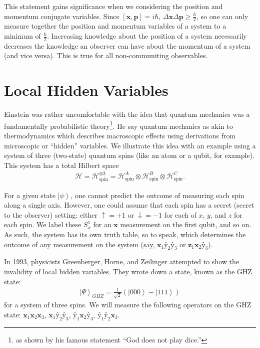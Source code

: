 \documentclass[11pt]{article} %
\newcommand{\ket}[1]{\left|#1\right\rangle}
\begin{document}
This statement gains significance when we considering the position and momentum conjugate variables. Since $\left[\textbf{\^x},\textbf{\^p}\right] = i\hbar$, $\Delta\textbf{\^x}\Delta\textbf{\^p} \geq \frac{\hbar}{2}$, so one can only measure together the position and momentum variables of a system to a minimum of $\frac{\hbar}{2}$. Increasing knowledge about the position of a system necessarily decreases the knowledge an observer can have about the momentum of a system (and vice versa). This is true for all non-communiting observables.

\section{Local Hidden Variables}

Einstein was rather uncomfortable with the idea that quantum mechanics was a fundamentally probabilistic theory\footnote{as shown by his famous statement ``God does not play dice.''}. He say quantum mechanics as akin to thermodynamics which describes macroscopic effects using derivations from microscopic or ``hidden'' variables. We illustrate this idea with an example using a system of three (two-state) quantum spins (like an atom or a qubit, for example). This system has a total Hilbert space
\begin{align}
\mathcal{H} = \mathcal{H}^{\otimes3}_\textrm{spin} = \mathcal{H}^A_\textrm{spin}\otimes\mathcal{H}^B_\textrm{spin}\otimes\mathcal{H}^C_\textrm{spin}.
\end{align}

For a given state $\ket{\psi}$, one cannot predict the outcome of measuring each spin along a single axis. However, one could assume that each spin has a secret (secret to the observer) setting: either $\uparrow = +1$ or $\downarrow = -1$ for each of $x$, $y$, and $z$ for each spin. We label these $S^1_x$ for an $\textbf{\^x}$ measurement on the first qubit, and so on. As such, the system has its own truth table, so to speak, which determines the outcome of any measurement on the system (say, $\textbf{\^x}_1\textbf{\^y}_2\textbf{\^y}_3$ or $\textbf{\^z}_1\textbf{\^x}_2\textbf{\^y}_3$).

In 1993, physicists Greenberger, Horne, and Zeilinger attempted to show the invalidity of local hidden variables. They wrote down a state, known as the GHZ state:
\begin{align}
    \ket{\Psi}_{GHZ} = \frac{1}{\sqrt{2}}\left(\ket{000} - \ket{111}\right)
\end{align}
for a system of three spins. We will measure the following operators on the GHZ state: $\textbf{\^x}_1\textbf{\^x}_2\textbf{\^x}_3$, $\textbf{\^x}_1\textbf{\^y}_2\textbf{\^y}_3$, $\textbf{\^y}_1\textbf{\^x}_2\textbf{\^y}_3$, $\textbf{\^y}_1\textbf{\^y}_2\textbf{\^x}_3$.
\end{document}

